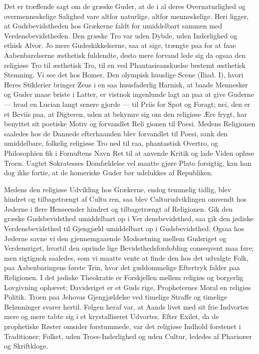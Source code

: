\documentclass[12pt]{book}
\newcommand{\opage}[1]{\marginnote{\footnotesize\textit{[#1]}}}
\begin{document}
Det er træffende sagt om de græske Guder, at de
i al deres Overnaturlighed og overmenneskelige Salighed
\opage{49}\setcounter{footnote}{0}%
vare altfor naturlige, altfor menneskelige. Heri ligger,
at Gudsbevidstheden hos Grækerne faldt for umiddelbart
sammen med Verdensbevidstheden. Den græske Tro var
uden Dybde, uden Inderlighed og ethisk Alvor. Jo mere
Gudeskikkelserne, saa at sige, trængte paa for at faae
Aabenbarelserne æsthetisk fuldendte, desto mere forvand\-%
lede sig da ogsaa den religiøse Tro til æsthetisk Tro,
til en ved Phantasieanskuelse bestemt æsthetisk Stemning.
Vi see det hos Homer. Den olympisk huuslige Scene
(Iliad. I), hvori Heres Stiklerier bringer Zeus i en saa
huusfaderlig Harnisk, at baade Mennesker og Guder maae
briste i Latter, er vistnok ingenlunde lagt an paa at
give Guderne --- hvad en Lucian langt senere gjorde ---
til Priis for Spot og Foragt; nei, den er et Beviis paa,
at Digteren, uden at bekymre sig om den religiøse Ære\-%
frygt, har benyttet sit poetiske Motiv og forvandlet Reli\-%
gionen til Poesi. Medens Religionen saaledes hos de
Dannede efterhaanden blev forvandlet til Poesi, sank den
umiddelbare, folkelig religiøse Tro ned til raa, phantastisk
Overtro, og Philosophien fik i Fornuftens Navn Ret til
at anvende Kritik og lade Viden opløse Troen. Uagtet
Sokratesses Domfældelse vel maatte gjøre Plato forsigtig,
kan han dog ikke fortie, at de homeriske Guder bør
udelukkes af Republiken.

Medens den religiøse Udvikling hos Grækerne, endog
temmelig tidlig, blev hindret og tilbagetrængt af Cultu\-%
ren, saa blev Culturudviklingen omvendt hos Jøderne i
flere Henseender hindret og tilbagetrængt af Religionen.
Gik den græske Gudsbevidsthed umiddelbart op i Ver\-%
densbevidsthed, saa gik den jødiske Verdensbevidsthed
til Gjengjæld umiddelbart op i Gudsbevidsthed. Ogsaa
hos Jøderne savne vi den gjennemgaaende Modsætning
mellem Gudsriget og Verdensriget, hvortil den oprinde\-%
lige Bevidsthedsfordobling conseqvent maa føre; men
\opage{50}\setcounter{footnote}{0}%
rigtignok saaledes, som vi maatte vente at finde den hos
det udvalgte Folk, paa Aabenbaringens første Trin, hvor
det guddommelige Eftertryk falder paa Religionen. I
det jødiske Theokratie er Forskjellen mellem religiøs og
borgerlig Lovgivning ophævet; Davidsriget er et Guds\-%
rige, Propheternes Moral en religiøs Politik. Troen paa
Jehovas Gjengjældelse ved timelige Straffe og timelige
Belønninger svarer hertil. Følgen heraf var, at Aands\-%
livet med sit frie Indvortes mere og mere tabte sig i et
krystalliseret Udvortes. Efter Exilet, da de prophetiske
Røster omsider forstummede, var det religiøse Indhold
forstenet i Traditioner; Folket, uden Troes-Inderlighed
og uden Cultur, lededes af Pharisæer og Skriftkloge.
\end{document}
